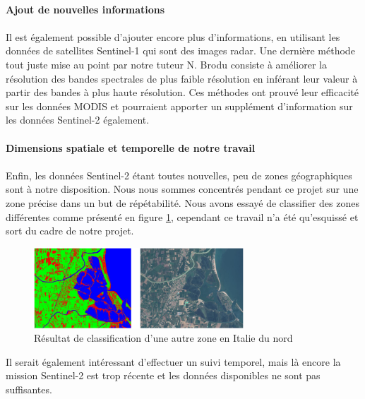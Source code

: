 \documentclass[a4paper,10pt]{article}
\begin{document}
\paragraph{Ajout de nouvelles informations}
\paragraph{}
Il est également possible d'ajouter encore plus d'informations, en utilisant les données de satellites Sentinel-1 qui sont des images radar. Une dernière méthode tout juste mise au point par notre tuteur N. Brodu consiste à améliorer la résolution des bandes spectrales de plus faible résolution en inférant leur valeur à partir des bandes à plus haute résolution. Ces méthodes ont prouvé leur efficacité sur les données MODIS et pourraient apporter un supplément d'information sur les données Sentinel-2 également.

\paragraph{Dimensions spatiale et temporelle de notre travail}
\paragraph{}
Enfin, les données Sentinel-2 étant toutes nouvelles, peu de zones géographiques sont à notre disposition. Nous nous sommes concentrés pendant ce projet sur une zone précise dans un but de répétabilité. Nous avons essayé de classifier des zones différentes comme présenté en figure \ref{fig:zone2}, cependant ce travail n'a été qu'esquissé et sort du cadre de notre projet.

\begin{figure}[H]
  \centering
    \includegraphics[width=0.7\textwidth]{zone2}
  \caption{Résultat de classification d'une autre zone en Italie du nord}
  \label{fig:zone2}
\end{figure}

Il serait également intéressant d'effectuer un suivi temporel, mais là encore la mission Sentinel-2 est trop récente et les données disponibles ne sont pas suffisantes. 
\end{document}
